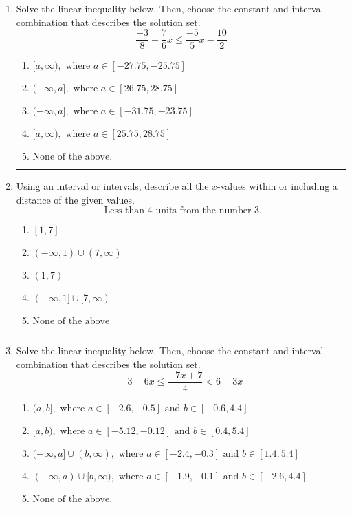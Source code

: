 \documentclass[14pt]{extbook}
\newcommand{\litem}[1]{\item#1\hspace*{-1cm}\rule{\textwidth}{0.4pt}}
\begin{document}
\begin{enumerate}
{\begin{enumerate}[label=\Alph*.]
\end{enumerate} }
\litem{
Solve the linear inequality below. Then, choose the constant and interval combination that describes the solution set.\[ \frac{-3}{8} - \frac{7}{6} x \leq \frac{-5}{5} x - \frac{10}{2} \]\begin{enumerate}[label=\Alph*.]
\item \( [a, \infty), \text{ where } a \in [-27.75, -25.75] \)
\item \( (-\infty, a], \text{ where } a \in [26.75, 28.75] \)
\item \( (-\infty, a], \text{ where } a \in [-31.75, -23.75] \)
\item \( [a, \infty), \text{ where } a \in [25.75, 28.75] \)
\item \( \text{None of the above}. \)

\end{enumerate} }
\litem{
Using an interval or intervals, describe all the $x$-values within or including a distance of the given values.\[ \text{ Less than } 4 \text{ units from the number } 3. \]\begin{enumerate}[label=\Alph*.]
\item \( [1, 7] \)
\item \( (-\infty, 1) \cup (7, \infty) \)
\item \( (1, 7) \)
\item \( (-\infty, 1] \cup [7, \infty) \)
\item \( \text{None of the above} \)

\end{enumerate} }
\litem{
Solve the linear inequality below. Then, choose the constant and interval combination that describes the solution set.\[ -3 - 6 x \leq \frac{-7 x + 7}{4} < 6 - 3 x \]\begin{enumerate}[label=\Alph*.]
\item \( (a, b], \text{ where } a \in [-2.6, -0.5] \text{ and } b \in [-0.6, 4.4] \)
\item \( [a, b), \text{ where } a \in [-5.12, -0.12] \text{ and } b \in [0.4, 5.4] \)
\item \( (-\infty, a] \cup (b, \infty), \text{ where } a \in [-2.4, -0.3] \text{ and } b \in [1.4, 5.4] \)
\item \( (-\infty, a) \cup [b, \infty), \text{ where } a \in [-1.9, -0.1] \text{ and } b \in [-2.6, 4.4] \)
\item \( \text{None of the above.} \)


\end{enumerate}}
\end{enumerate}
\end{document}
